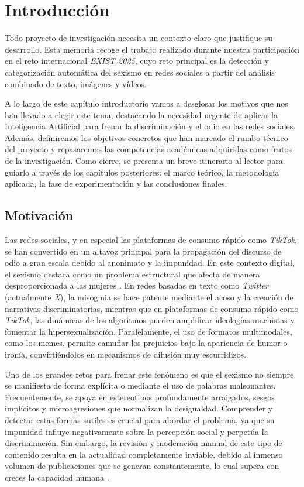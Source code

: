 \chapter{Introducción}
\label{cap:Introduccion}
Todo proyecto de investigación necesita un contexto claro que justifique su desarrollo. Esta memoria recoge el trabajo realizado durante nuestra participación en el reto internacional \textit{EXIST 2025}, cuyo reto principal es la detección y categorización automática del sexismo en redes sociales a partir del análisis combinado de texto, imágenes y vídeos.

A lo largo de este capítulo introductorio vamos a desglosar los motivos que nos han llevado a elegir este tema, destacando la necesidad urgente de aplicar la Inteligencia Artificial para frenar la discriminación y el odio en las redes sociales. Además, definiremos los objetivos concretos que han marcado el rumbo técnico del proyecto y repasaremos las competencias académicas adquiridas como frutos de la investigación. Como cierre, se presenta un breve itinerario al lector para guiarlo a través de los capítulos posteriores: el marco teórico, la metodología aplicada, la fase de experimentación y las conclusiones finales. 

\section{Motivación}
\label{sec:Motivacion}
Las redes sociales, y en especial las plataformas de consumo rápido como \textit{TikTok}, se han convertido en un altavoz principal para la propagación del discurso de odio a gran escala debido al anonimato y la impunidad. En este contexto digital, el sexismo destaca como un problema estructural que afecta de manera desproporcionada a las mujeres \cite{plaza2025overview}. En redes basadas en texto como \textit{Twitter} (actualmente \textit{X}), la misoginia se hace patente mediante el acoso y la creación de narrativas discriminatorias, mientras que en plataformas de consumo rápido como \textit{TikTok}, las dinámicas de los algoritmos pueden amplificar ideologías machistas y fomentar la hipersexualización. Paralelamente, el uso de formatos multimodales, como los memes, permite camuflar los prejuicios bajo la apariencia de humor o ironía, convirtiéndolos en mecanismos de difusión muy escurridizos. 

Uno de los grandes retos para frenar este fenómeno es que el sexismo no siempre se manifiesta de forma explícita o mediante el uso de palabras malsonantes. Frecuentemente, se apoya en estereotipos profundamente arraigados, sesgos implícitos y microagresiones que normalizan la desigualdad. Comprender y detectar estas formas sutiles es crucial para abordar el problema, ya que su impunidad influye negativamente sobre la percepción social y perpetúa la discriminación. Sin embargo, la revisión y moderación manual de este tipo de contenido resulta en la actualidad completamente inviable, debido al inmenso volumen de publicaciones que se generan constantemente, lo cual supera con creces la capacidad humana \cite{tian2025mario}.

